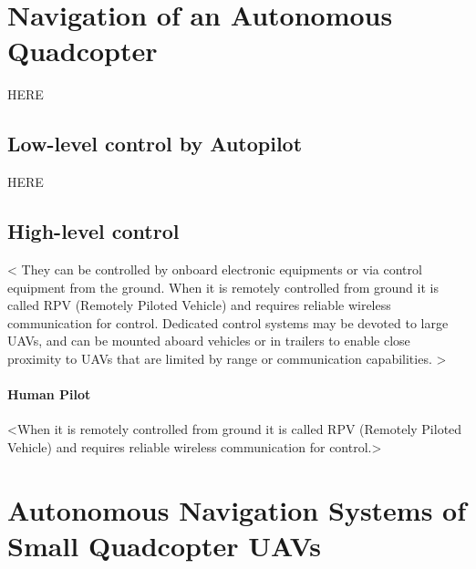 \section{Navigation of an Autonomous Quadcopter}

HERE

\subsection{Low-level control by Autopilot}

HERE

\subsection{High-level control}

<
They can be controlled by onboard electronic equipments 
or via control equipment from the ground. 
When it is remotely controlled from ground 
it is called RPV (Remotely Piloted Vehicle) 
and requires reliable wireless communication for control. 
Dedicated control systems may be devoted to large UAVs, 
and can be mounted aboard vehicles or in trailers 
to enable close proximity to UAVs that are 
limited by range or communication capabilities.
>


\paragraph{Human Pilot}
<When it is remotely controlled from ground 
it is called RPV (Remotely Piloted Vehicle) 
and requires reliable wireless communication for control.>








\section{Autonomous Navigation Systems of Small Quadcopter UAVs}

